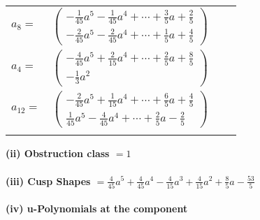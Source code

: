 \documentclass[1p]{elsarticle_modified}
\theoremstyle{definition}
\begin{document}
\begin{tabular}{m{7pt} m{180pt} m{7pt} m{180pt} }
\flushright $a_{8}=$&$\begin{pmatrix}-\frac{1}{45} a^5-\frac{1}{45} a^4+\cdots+\frac{3}{5} a+\frac{2}{5}\\-\frac{2}{45} a^5-\frac{2}{45} a^4+\cdots+\frac{1}{5} a+\frac{4}{5}\end{pmatrix}$ \\
\flushright $a_{4}=$&$\begin{pmatrix}-\frac{4}{45} a^5+\frac{2}{15} a^4+\cdots+\frac{2}{5} a+\frac{8}{5}\\-\frac{1}{3} a^2\end{pmatrix}$ \\
\flushright $a_{12}=$&$\begin{pmatrix}-\frac{2}{45} a^5+\frac{1}{15} a^4+\cdots+\frac{6}{5} a+\frac{4}{5}\\\frac{1}{45} a^5-\frac{4}{45} a^4+\cdots+\frac{2}{5} a-\frac{2}{5}\end{pmatrix}$\\&\end{tabular}
\flushleft \textbf{(ii) Obstruction class $= 1$}\\~\\
\flushleft \textbf{(iii) Cusp Shapes $= \frac{4}{45} a^5+\frac{4}{45} a^4-\frac{4}{15} a^3+\frac{4}{15} a^2+\frac{8}{5} a-\frac{53}{5}$}\\~\\
\newpage\renewcommand{\arraystretch}{1}
\flushleft \textbf{(iv) u-Polynomials at the component}\newline \\
\end{document}

